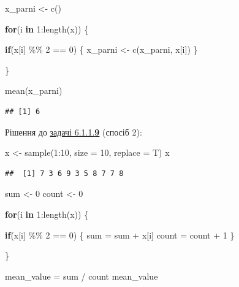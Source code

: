\documentclass[
]{book}
\newenvironment{Shaded}{\begin{snugshade}}{\end{snugshade}}
\newcommand{\AttributeTok}[1]{\textcolor[rgb]{0.77,0.63,0.00}{#1}}
\newcommand{\ControlFlowTok}[1]{\textcolor[rgb]{0.13,0.29,0.53}{\textbf{#1}}}
\newcommand{\DecValTok}[1]{\textcolor[rgb]{0.00,0.00,0.81}{#1}}
\newcommand{\FunctionTok}[1]{\textcolor[rgb]{0.00,0.00,0.00}{#1}}
\newcommand{\NormalTok}[1]{#1}
\newcommand{\OtherTok}[1]{\textcolor[rgb]{0.56,0.35,0.01}{#1}}
\newcommand{\SpecialCharTok}[1]{\textcolor[rgb]{0.00,0.00,0.00}{#1}}
\begin{document}
\begin{Shaded}
\begin{Highlighting}[]
\NormalTok{x\_parni }\OtherTok{\textless{}{-}} \FunctionTok{c}\NormalTok{()}

\ControlFlowTok{for}\NormalTok{(i }\ControlFlowTok{in} \DecValTok{1}\SpecialCharTok{:}\FunctionTok{length}\NormalTok{(x)) \{}
  
  \ControlFlowTok{if}\NormalTok{(x[i] }\SpecialCharTok{\%\%} \DecValTok{2} \SpecialCharTok{==} \DecValTok{0}\NormalTok{) \{}
\NormalTok{    x\_parni }\OtherTok{\textless{}{-}} \FunctionTok{c}\NormalTok{(x\_parni, x[i])}
\NormalTok{  \}}
  
\NormalTok{\}}

\FunctionTok{mean}\NormalTok{(x\_parni)}
\end{Highlighting}
\end{Shaded}

\begin{verbatim}
## [1] 6
\end{verbatim}

Рішення до \protect\hyperlink{task6119}{задачі 6.1.1.\textbf{9}} (спосіб 2):

\begin{Shaded}
\begin{Highlighting}[]
\NormalTok{x }\OtherTok{\textless{}{-}} \FunctionTok{sample}\NormalTok{(}\DecValTok{1}\SpecialCharTok{:}\DecValTok{10}\NormalTok{, }\AttributeTok{size =} \DecValTok{10}\NormalTok{, }\AttributeTok{replace =}\NormalTok{ T)}
\NormalTok{x}
\end{Highlighting}
\end{Shaded}

\begin{verbatim}
##  [1] 7 3 6 9 3 5 8 7 7 8
\end{verbatim}

\begin{Shaded}
\begin{Highlighting}[]
\NormalTok{sum }\OtherTok{\textless{}{-}} \DecValTok{0}
\NormalTok{count }\OtherTok{\textless{}{-}} \DecValTok{0}

\ControlFlowTok{for}\NormalTok{(i }\ControlFlowTok{in} \DecValTok{1}\SpecialCharTok{:}\FunctionTok{length}\NormalTok{(x)) \{}
  
  \ControlFlowTok{if}\NormalTok{(x[i] }\SpecialCharTok{\%\%} \DecValTok{2} \SpecialCharTok{==} \DecValTok{0}\NormalTok{) \{}
\NormalTok{    sum }\OtherTok{=}\NormalTok{ sum }\SpecialCharTok{+}\NormalTok{ x[i]}
\NormalTok{    count }\OtherTok{=}\NormalTok{ count }\SpecialCharTok{+} \DecValTok{1}
\NormalTok{  \}}
  
\NormalTok{\}}

\NormalTok{mean\_value }\OtherTok{=}\NormalTok{ sum }\SpecialCharTok{/}\NormalTok{ count}
\NormalTok{mean\_value}
\end{Highlighting}
\end{Shaded}
\end{document}

